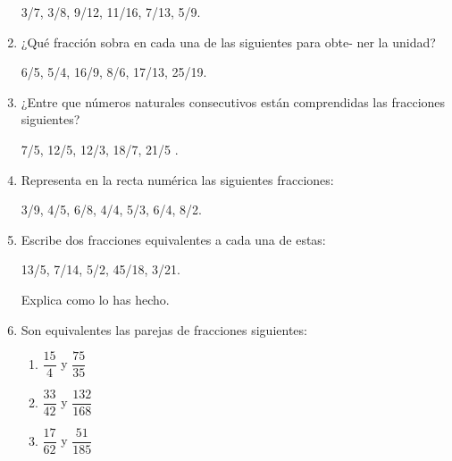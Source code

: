 \documentclass[10pt,twoside]{article}
\begin{document}
\begin{enumerate}
3/7, 3/8, 9/12, 11/16, 7/13, 5/9.
\item ¿Qué fracción sobra en cada una de las siguientes para obte-
ner la unidad?

6/5, 5/4, 16/9, 8/6, 17/13, 25/19.
\item ¿Entre que números naturales consecutivos están comprendidas las fracciones siguientes? 

7/5, 12/5, 12/3, 18/7, 21/5 .
\item Representa en la recta numérica las siguientes fracciones:

3/9, 4/5, 6/8, 4/4, 5/3, 6/4, 8/2.
\item Escribe dos fracciones equivalentes a cada una de estas:

13/5, 7/14, 5/2, 45/18, 3/21.

Explica como lo has hecho.
\item  Son equivalentes las parejas de fracciones siguientes:
\begin{enumerate}
 \item $\dfrac{15}{4}$ y $\dfrac{75}{35}$
 \item $\dfrac{33}{42}$ y $\dfrac{132}{168}$
 \item $\dfrac{17}{62}$ y $\dfrac{51}{185}$
\end{enumerate}

\end{enumerate}
\end{document}
